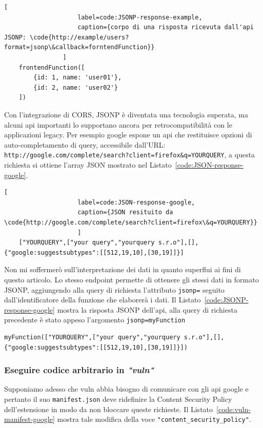 \documentclass{sapthesis}
\newcommand{\code}[1]{\texttt{#1}}
\newcommand{\refCode}[1]{Listato~\ref{#1}}
\newcommand{\vuln}{\textit{"vuln"}}
\newcommand{\manifest}{\code{manifest.json}}
\begin{document}
                \begin{lstlisting}[
                    label=code:JSONP-response-example,
                    caption={corpo di una risposta ricevuta dall'api JSONP: \code{http://example/users?format=jsonp\&callback=forntendFunction}}
                ]
    frontendFunction([
        {id: 1, name: 'user01'},
        {id: 2, name: 'user02'}
    ])
                \end{lstlisting}

                Con l'integrazione di CORS, JSONP è diventata una tecnologia superata, ma alcuni api importanti
                lo supportano ancora per retrocompatibilità con le applicazioni legacy. Per esempio google
                espone un api che restituisce opzioni di auto-completamento di query, accessibile dall'URL:
                \code{http://google.com/complete/search?client=firefox\&q=YOURQUERY}, a questa richiesta si
                ottiene l'array JSON mostrato nel \refCode{code:JSON-response-google}.

                \begin{lstlisting}[
                    label=code:JSON-response-google, 
                    caption={JSON resituito da \code{http://google.com/complete/search?client=firefox\&q=YOURQUERY}}
                    ]
    ["YOURQUERY",["your query","yourquery s.r.o"],[],{"google:suggestsubtypes":[[512,19,10],[30,19]]}]
                \end{lstlisting}

                Non mi soffermerò sull'interpretazione dei dati in quanto superflui ai fini di questo articolo.
                Lo stesso endpoint permette di ottenere gli stessi dati in formato JSONP, aggiungendo alla query
                di richiesta l'attributo \code{jsonp=} seguito dall'identificatore della funzione che elaborerà
                i dati. Il \refCode{code:JSONP-response-google} mostra la risposta JSONP dell'api, alla query di
                richiesta precedente è stato appeso l'argomento \code{jsonp=myFunction}

                \begin{lstlisting}[label=code:JSONP-response-google, caption={JSON resituito da \code{http://google.com/complete/search?client=firefox\&q=YOURQUERY\&jsonp=myFunction}}]
    myFunction(["YOURQUERY",["your query","yourquery s.r.o"],[],{"google:suggestsubtypes":[[512,19,10],[30,19]]}])
                \end{lstlisting}


                \subsubsection{Eseguire codice arbitrario in \vuln}
                Supponiamo adesso che vuln abbia bisogno di comunicare con gli api google e pertanto il
                suo \manifest{} deve ridefinire la Content Security Policy dell'estensione in modo da
                non bloccare queste richieste. Il \refCode{code:vuln-manifest-google} mostra tale
                modifica della voce \code{"content\_security\_policy"}.
\end{document}
